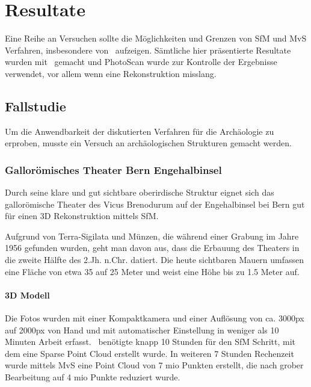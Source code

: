 \chapter{Resultate} \label{resultate}
	Eine Reihe an Versuchen sollte die Möglichkeiten und Grenzen von SfM und MvS Verfahren, insbesondere von \dronarch\ aufzeigen. Sämtliche hier präsentierte Resultate wurden mit \dronarch\ gemacht und PhotoScan wurde zur Kontrolle der Ergebnisse verwendet, vor allem wenn eine Rekonstruktion misslang.
	
	\section{Fallstudie}\label{res:fall}
		Um die Anwendbarkeit der diskutierten Verfahren für die Archäologie zu erproben, musste ein Versuch an archäologischen Strukturen gemacht werden.

		\subsection{Gallorömisches Theater Bern Engehalbinsel}\label{res:enge}
			Durch seine klare und gut sichtbare oberirdische Struktur eignet sich das gallorömische Theater des Vicus Brenodurum auf der Engehalbinsel bei Bern gut für einen 3D Rekonstruktion mittels SfM.
			
			Aufgrund von Terra-Sigilata und Münzen, die während einer Grabung im Jahre 1956 gefunden wurden, geht man davon aus, dass die Erbauung des Theaters in die zweite Hälfte des 2.Jh. n.Chr. datiert. Die heute sichtbaren Mauern umfassen eine Fläche von etwa 35 auf 25 Meter und weist eine Höhe bis zu 1.5 Meter auf.	
							
			\subsubsection{3D Modell}
				Die Fotos wurden mit einer Kompaktkamera und einer Auflösung von ca. 3000px auf 2000px von Hand und mit automatischer Einstellung in weniger als 10 Minuten Arbeit erfasst.
				\dronarch\ benötigte knapp 10 Stunden für den SfM Schritt, mit dem eine Sparse Point Cloud erstellt wurde.
				In weiteren 7 Stunden Rechenzeit wurde mittels MvS eine Point Cloud von 7 mio Punkten erstellt, die nach grober Bearbeitung auf 4 mio Punkte reduziert wurde.

